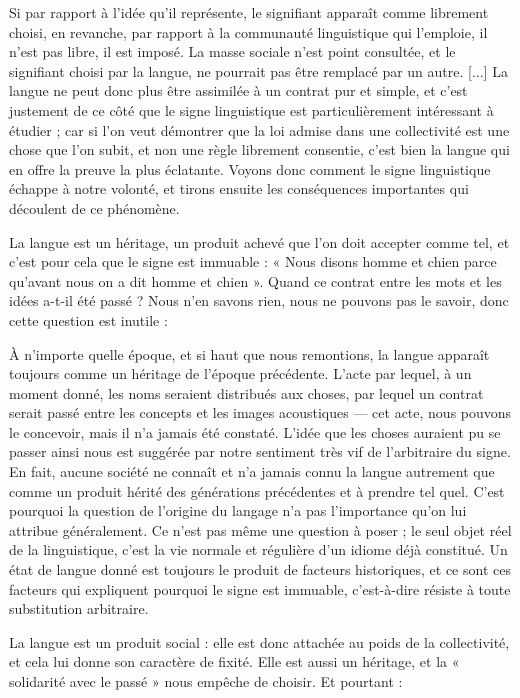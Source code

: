 \begin{lecture}{}
Si par rapport à l’idée qu’il représente, le signifiant apparaît comme librement choisi, en revanche, par rapport à la communauté linguistique qui l’emploie, il n’est pas libre, il est imposé. La masse sociale n’est point consultée, et le signifiant choisi par la langue, ne pourrait pas être remplacé par un autre. [...] La langue ne peut donc plus être assimilée à un contrat pur et simple, et c’est justement de ce côté que le signe linguistique est particulièrement intéressant à étudier ; car si l’on veut démontrer que la loi admise dans une collectivité est une chose que l’on subit, et non une règle librement consentie, c’est bien la langue qui en offre la preuve la plus éclatante. Voyons donc comment le signe linguistique échappe à notre volonté, et tirons ensuite les conséquences importantes qui découlent de ce phénomène.
\end{lecture}
La langue est un héritage, un produit achevé que l’on doit accepter comme tel, et c’est pour cela que le signe est immuable : « Nous disons homme et chien parce qu’avant nous on a dit homme et chien ». Quand ce contrat entre les mots et les idées a-t-il été passé ? Nous n’en savons rien, nous ne pouvons pas le savoir, donc cette question est inutile :
\begin{lecture}{}
À n’importe quelle époque, et si haut que nous remontions, la langue apparaît toujours comme un héritage de l’époque précédente. L’acte par lequel, à un moment donné, les noms seraient distribués aux choses, par lequel un contrat serait passé entre les concepts et les images acoustiques — cet acte, nous pouvons le concevoir, mais il n’a jamais été constaté. L’idée que les choses auraient pu se passer ainsi nous est suggérée par notre sentiment très vif de l’arbitraire du signe. En fait, aucune société ne connaît et n’a jamais connu la langue autrement que comme un produit hérité des générations précédentes et à prendre tel quel. C’est pourquoi la question de l’origine du langage n’a pas l’importance qu’on lui attribue généralement. Ce n’est pas même une question à poser ; le seul objet réel de la linguistique, c’est la vie normale et régulière d’un idiome déjà constitué. Un état de langue donné est toujours le produit de facteurs historiques, et ce sont ces facteurs qui expliquent pourquoi le signe est immuable, c’est-à-dire résiste à toute substitution arbitraire.
\end{lecture}
La langue est un produit social : elle est donc attachée au poids de la collectivité, et cela lui donne son caractère de fixité. Elle est aussi un héritage, et la « solidarité avec le passé » nous empêche de choisir. Et pourtant :
